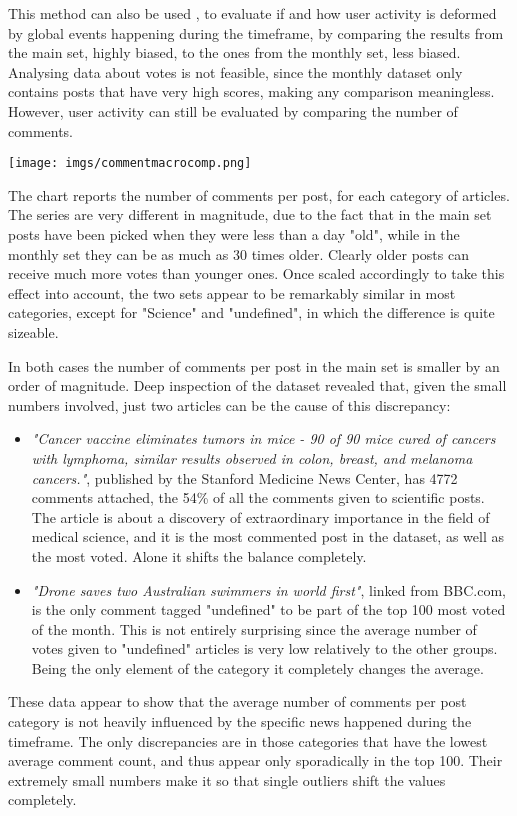 \documentclass{article}
\begin{document}
This method can also be used , to evaluate if and how user activity is deformed by global events happening during the timeframe, by comparing the results from the main set, highly biased, to the ones from the monthly set, less biased. Analysing data about votes is not feasible, since the monthly dataset only contains posts that have very high scores, making any comparison meaningless. However, user activity can still be evaluated by comparing the number of comments.

\bigskip

\texttt{[image: imgs/commentmacrocomp.png]}

\bigskip

The chart reports the number of comments per post, for each category of articles. The series are very different in magnitude, due to the fact that in the main set posts have been picked when they were less than a day "old", while in the monthly set they can be as much as 30 times older. Clearly older posts can receive much more votes than younger ones. Once scaled accordingly to take this effect into account, the two sets appear to be remarkably similar in most categories, except for "Science" and "undefined", in which the difference is quite sizeable. 

In both cases the number of comments per post in the main set is smaller by an order of magnitude. Deep inspection of the dataset revealed that, given the small numbers involved, just two articles can be the cause of this discrepancy:
\begin{itemize}
\item \textit{"Cancer vaccine eliminates tumors in mice - 90 of 90 mice cured of cancers with lymphoma, similar results observed in colon, breast, and melanoma cancers."}\cite{cancervaccine}, published by the Stanford Medicine News Center, has 4772 comments attached, the 54\% of all the comments given to scientific posts. The article is about a discovery of extraordinary importance in the field of medical science, and it is the most commented post in the dataset, as well as the most voted. Alone it shifts the balance completely.
\item \textit{"Drone saves two Australian swimmers in world first"}\cite{dronesaves}, linked from BBC.com, is the only comment tagged "undefined" to be part of the top 100 most voted of the month. This is not entirely surprising since the average number of votes given to "undefined" articles is very low relatively to the other groups. Being the only element of the category it completely changes the average.
\end{itemize}
These data appear to show that the average number of comments per post category is not heavily influenced by the specific news happened during the timeframe. The only discrepancies are in those categories that have the lowest average comment count, and thus appear only sporadically in the top 100. Their extremely small numbers make it so that single outliers shift the values completely.
\end{document}

